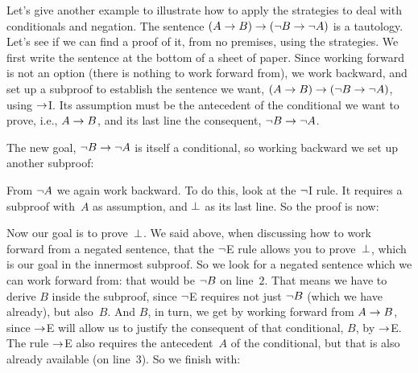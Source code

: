 Let's give another example to illustrate how to apply the strategies
to deal with conditionals and negation. The sentence $(A \rightarrow B) \rightarrow
(\neg B \rightarrow \neg A)$ is a tautology. Let's see if we can find a
proof of it, from no premises, using the strategies. We first write
the sentence at the bottom of a sheet of paper. Since working forward
is not an option (there is nothing to work forward from), we work
backward, and set up a subproof to establish the sentence we want, $(A
\rightarrow B) \rightarrow (\neg B \rightarrow \neg A)$, using $\rightarrow$I. Its assumption
must be the antecedent of the conditional we want to prove, i.e., $A
\rightarrow B$, and its last line the consequent, $\neg B \rightarrow \neg A$.
\begin{fitchproof}
\open
{}\AS
\ellipsesline
{}
\close
{}
\end{fitchproof}
The new goal, $\neg B \rightarrow \neg A$ is itself a conditional, so working backward we set up another subproof:
\begin{fitchproof}
	\open
	\AS
	\open
	\AS
	\ellipsesline
	\close
	\close
\end{fitchproof}
From $\neg A$ we again work backward. To do this, look at the $\neg$I rule. It requires a subproof with~$A$ as assumption, and $\bot$ as its last line. So the proof is now:
\begin{fitchproof}
	\open
	\AS
	\open
	\AS
	\open{}
	\ellipsesline
	\close
	\close
	\close
\end{fitchproof}
Now our goal is to prove~$\bot$. We said above, when discussing how
to work forward from a negated sentence, that the $\neg$E rule allows
you to prove~$\bot$, which is our goal in the innermost subproof. So
we look for a negated sentence which we can work forward from: that
would be $\neg B$ on line~$2$. That means we have to derive $B$
inside the subproof, since $\neg$E requires not just $\neg B$ (which
we have already), but also~$B$. And $B$, in turn, we get by working
forward from $A \rightarrow B$, since $\rightarrow$E will allow us to justify the
consequent of that conditional, $B$, by $\rightarrow$E. The rule $\rightarrow$E also
requires the antecedent~$A$ of the conditional, but that is also
already available (on line~$3$). So we finish with:
\begin{fitchproof}
	\open
	\AS
	\open
	\AS
	\open{}
	\close
	\close
	\close
\end{fitchproof}

